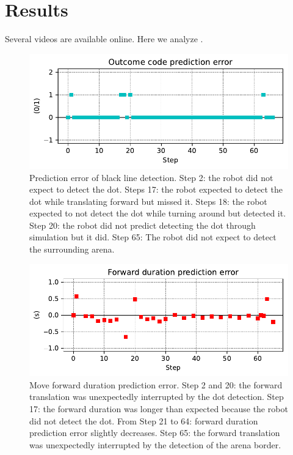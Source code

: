 \documentclass[runningheads]{llncs}
\begin{document}


\section{Results}

Several videos are available online. Here we analyze \cite{georgeon_petitcat_2024}.

\begin{figure}
	\includegraphics[width=\textwidth]{01_Outcome_code.pdf}
	\caption{Prediction error of black line detection.
	Step 2: the robot did not expect to detect the dot.
	Steps 17: the robot expected to detect the dot while translating forward but missed it.
	Steps 18: the robot expected to not detect the dot while turning around but detected it.
	Step 20: the robot did not predict detecting the dot through simulation but it did. 
	Step 65: The robot did not expect to detect the surrounding arena. } \label{fig:yaw_pe}
\end{figure}

\begin{figure}
	\includegraphics[width=\textwidth]{07_Forward_duration_pe.pdf}
	\caption{Move forward duration prediction error.
	Step 2 and 20: the forward translation was unexpectedly interrupted by the dot detection.
	Step 17: the forward duration was longer than expected because the robot did not detect the dot.
	From Step 21 to 64: forward duration prediction error slightly decreases. 
	Step 65: the forward translation was unexpectedly interrupted by the detection of the arena border.} \label{fig:yaw_re}
\end{figure}
\end{document}
